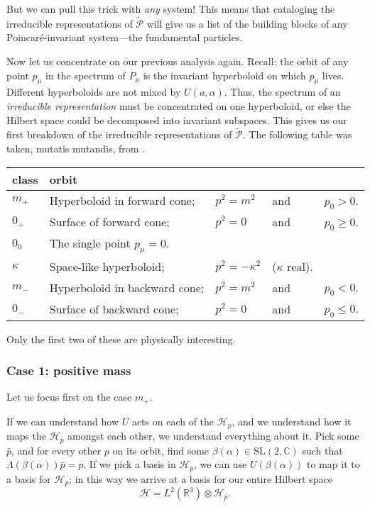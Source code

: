 \documentclass[a4paper]{report}
\newcommand{\R}{\mathbb{R}}
\newcommand{\C}{\mathbb{C}}
\newcommand{\SL}{\mathrm{SL}}
\theoremstyle{definition}
\theoremstyle{plain}
\theoremstyle{remark}
\begin{document}
But we can pull this trick with \emph{any} system! This means that cataloging the irreducible representations of $\widetilde{\mathcal{P}}$ will give us a list of the building blocks of any Poincar{\'e}-invariant system---the fundamental particles.

Now let us concentrate on our previous analysis again. Recall: the orbit of any point $p_{\mu}$ in the spectrum of $P_{\mu}$ is the invariant hyperboloid on which $p_{\mu}$ lives. Different hyperboloids are not mixed by $U(a, \alpha)$. Thus, the spectrum of an \emph{irreducible representation} must be concentrated on one hyperboloid, or else the Hilbert space could be decomposed into invariant subspaces. This gives us our first breakdown of the irreducible representations of $\widetilde{\mathcal{P}}$. The following table was taken, mutatis mutandis, from \cite{haag-local-quantum-physics}.

\begin{center}
  \begin{tabular}{l l l l l}
    class & orbit &  \\
    \hline
    $m_{+}$ & Hyperboloid in forward cone; & $p^{2} = m^{2}$ & and & $p_{0} > 0$. \\
    $0_{+}$ & Surface of forward cone; & $p^{2} = 0$ & and & $p_{0} \geq 0$. \\
    $0_{0}$ & The single point $p_{\mu} = 0$. \\
    $\kappa$ & Space-like hyperboloid; & $p^{2} = -\kappa^{2}$ & ($\kappa$ real). \\
    $m_{-}$ & Hyperboloid in backward cone; & $p^{2} = m^{2}$ & and & $p_{0} < 0$. \\
    $0_{-}$ & Surface of backward cone; & $p^{2} = 0$ & and & $p_{0} \leq 0$. \\
    \hline
  \end{tabular}
\end{center}
Only the first two of these are physically interesting.

\subsubsection{Case 1: positive mass}
Let us focus first on the case $m_{+}$.

If we can understand how $U$ acts on each of the $\mathscr{H}_{p}$, and we understand how it maps the $\mathscr{H}_{p}$ amongst each other, we understand everything about it. Pick some $\bar{p}$, and for every other $p$ on its orbit, find some $\beta(\alpha) \in \SL(2, \C)$ such that $\Lambda(\beta(\alpha))\bar{p} = p$. If we pick a basis in $\mathscr{H}_{\bar{p}}$, we can use $U(\beta(\alpha))$ to map it to a basis for $\mathscr{H}_{p}$; in this way we arrive at a basis for our entire Hilbert space 
\begin{equation*}
  \mathscr{H} = L^{2}(\R^{3}) \otimes \mathscr{H}_{\bar{p}}.
\end{equation*}
\end{document}
